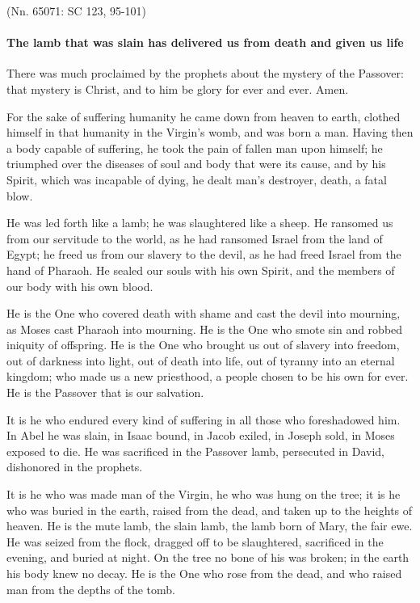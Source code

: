 
\par \hfill(Nn. 65071: SC 123, 95-101)

\paragraph{The lamb that was slain has delivered us from death and given us life}

There was much proclaimed by the prophets about the mystery of the Passover: that mystery is Christ, and to him be glory for ever and ever. Amen.

For the sake of suffering humanity he came down from heaven to earth, clothed himself in that humanity in the Virgin’s womb, and was born a man. Having then a body capable of suffering, he took the pain of fallen man upon himself; he triumphed over the diseases of soul and body that were its cause, and by his Spirit, which was incapable of dying, he dealt man’s destroyer, death, a fatal blow.

He was led forth like a lamb; he was slaughtered like a sheep. He ransomed us from our servitude to the world, as he had ransomed Israel from the land of Egypt; he freed us from our slavery to the devil, as he had freed Israel from the hand of Pharaoh. He sealed our souls with his own Spirit, and the members of our body with his own blood.

He is the One who covered death with shame and cast the devil into mourning, as Moses cast Pharaoh into mourning. He is the One who smote sin and robbed iniquity of offspring. He is the One who brought us out of slavery into freedom, out of darkness into light, out of death into life, out of tyranny into an eternal kingdom; who made us a new priesthood, a people chosen to be his own for ever. He is the Passover that is our salvation.

It is he who endured every kind of suffering in all those who foreshadowed him. In Abel he was slain, in Isaac bound, in Jacob exiled, in Joseph sold, in Moses exposed to die. He was sacrificed in the Passover lamb, persecuted in David, dishonored in the prophets.

It is he who was made man of the Virgin, he who was hung on the tree; it is he who was buried in the earth, raised from the dead, and taken up to the heights of heaven. He is the mute lamb, the slain lamb, the lamb born of Mary, the fair ewe. He was seized from the flock, dragged off to be slaughtered, sacrificed in the evening, and buried at night. On the tree no bone of his was broken; in the earth his body knew no decay. He is the One who rose from the dead, and who raised man from the depths of the tomb.

